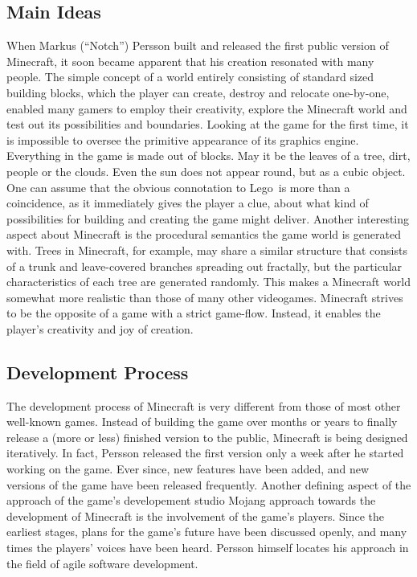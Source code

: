         \subsection{Main Ideas}
When Markus (``Notch'') Persson built and released the first public version of Minecraft, it soon became apparent that his creation resonated with many people. The simple concept of a world entirely consisting of standard sized building blocks, which the player can create, destroy and relocate one-by-one, enabled many gamers to employ their creativity, explore the Minecraft world and test out its possibilities and boundaries. Looking at the game for the first time, it is impossible to oversee the primitive appearance of its graphics engine. Everything in the game is made out of blocks. May it be the leaves of a tree, dirt, people or the clouds. Even the sun does not appear round, but as a cubic object. One can assume that the obvious connotation to Lego\texttrademark~is more than a coincidence, as it immediately gives the player a clue, about what kind of possibilities for building and creating the game might deliver. Another interesting aspect about Minecraft is the procedural semantics the game world is generated with. Trees in Minecraft, for example, may share a similar structure that consists of a trunk and leave-covered branches spreading out fractally, but the particular characteristics of each tree are generated randomly. This makes a Minecraft world somewhat more realistic than those of many other videogames. Minecraft strives to be the opposite of a game with a strict game-flow. Instead, it enables the player's creativity and joy of creation.

        \subsection{Development Process}
The development process of Minecraft is very different from those of most other well-known games. Instead of building the game over months or years to finally release a (more or less) finished version to the public, Minecraft is being designed iteratively. In fact, Persson released the first version only a week after he started working on the game. Ever since, new features have been added, and new versions of the game have been released frequently. Another defining aspect of the approach of the game's developement studio Mojang approach towards the development of Minecraft is the involvement of the game's players. Since the earliest stages, plans for the game's future have been discussed openly, and many times the players' voices have been heard. Persson himself locates his approach in the field of agile software development.~\cite{Duncan:2011:MBC:2207096.2207097}

